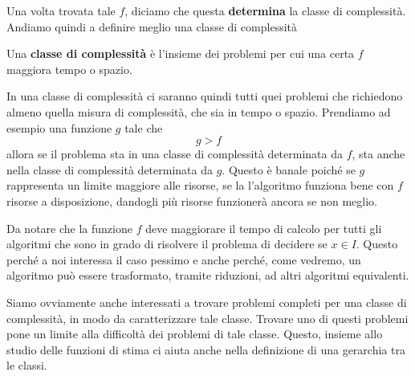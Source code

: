 Una volta trovata tale $f$, diciamo che questa \textbf{determina}
la classe di complessità. Andiamo quindi a definire meglio una
classe di complessità

\begin{definition}
	Una \textbf{classe di complessità} è l'insieme dei problemi
	per cui una certa $f$ maggiora tempo o spazio.
\end{definition}

In una classe di complessità ci saranno quindi tutti quei
problemi che richiedono almeno quella misura di complessità, che
sia in tempo o spazio. Prendiamo ad esempio una funzione $g$
tale che
\[ g > f \]
allora se il problema sta in una classe di complessità
determinata da $f$, sta anche nella classe di complessità
determinata da $g$. Questo è banale poiché se $g$ rappresenta un
limite maggiore alle risorse, se la l'algoritmo funziona bene
con $f$ risorse a disposizione, dandogli più risorse funzionerà
ancora se non meglio.

Da notare che la funzione $f$ deve maggiorare il tempo di
calcolo per tutti gli algoritmi che sono in grado di risolvere
il problema di decidere se $x \in I$. Questo perché a noi
interessa il caso pessimo e anche perché, come vedremo, un
algoritmo può essere trasformato, tramite riduzioni, ad altri
algoritmi equivalenti.

Siamo ovviamente anche interessati a trovare problemi completi
per una classe di complessità, in modo da caratterizzare tale
classe. Trovare uno di questi problemi pone un limite alla
difficoltà dei problemi di tale classe. Questo, insieme allo
studio delle funzioni di stima ci aiuta anche nella definizione
di una gerarchia tra le classi.
